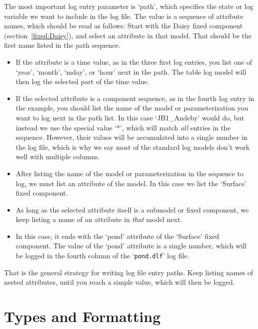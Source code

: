 The most important log entry parameter is `path', which specifies the
state or log variable we want to include in the log file.  The value
is a sequence of attribute names, which should be read as follows:
Start with the Daisy fixed component (section~\ref{fixed:Daisy}), and
select an attribute in that model.  That should be the first name
listed in the path sequence.
\begin{itemize}
\item If the attribute is a time value, as in the three first log
  entries, you list one of `year', `month', `mday', or `hour' next in
  the path.  The table log model will then log the selected part of
  the time value.
\item If the selected attribute is a component sequence, as in the
  fourth log entry in the example, you should list the name of the
  model or parameterization you want to log next in the path list.  In
  this case `JB1\_Andeby' would do, but instead we use the special
  value `*', which will match \emph{all} entries in the sequence.
  However, their values will be accumulated into a single number in
  the log file, which is why we say most of the standard log models
  don't work well with multiple columns.
\item After listing the name of the model or parameterization in the
  sequence to log, we must list an attribute of the model.  In this
  case we list the `Surface' fixed component.
\item As long as the selected attribute itself is a submodel or fixed
  component, we keep listing a name of an attribute in \emph{that}
  model next.
\item In this case, it ends with the `pond' attribute of the `Surface'
  fixed component.  The value of the `pond' attribute is a single
  number, which will be logged in the fourth column of the
  `\texttt{pond.dlf}' log file.
\end{itemize}
That is the general strategy for writing log file entry paths.  Keep
listing names of nested attributes, until you reach a simple value,
which will then be logged.

\section{Types and Formatting}
\label{sec:types}

